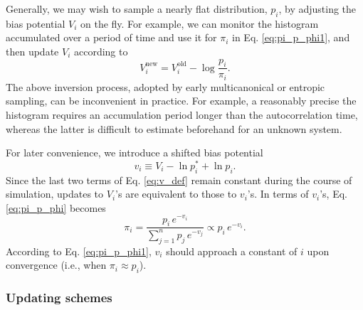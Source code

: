 \documentclass[reprint]{revtex4-1}
\begin{document}
Generally, we may wish to sample
a nearly flat distribution\cite{dayal2004, trebst2004, singh2011},
$p_i$,
by adjusting the bias potential $V_i$
on the fly.
%
For example,
we can monitor the histogram accumulated over
a period of time and use it for $\pi_i$ in
Eq. \eqref{eq:pi_p_phi1},
and then update
$V_i$ according to
$$
V_i^{\mathrm{new}}
=
V_i^{\mathrm{old}}
-
\log \frac{ p_i } { \pi_i }.
$$
%
%
The above inversion process,
adopted by early multicanonical or
entropic sampling\cite{berg1992, lee1993},
can be inconvenient in practice.
%
For example, a reasonably precise the histogram
requires an accumulation period
longer than the autocorrelation time,
whereas the latter is difficult to
estimate beforehand for an unknown system.


For later convenience, we introduce a shifted bias potential
%
\begin{equation}
  v_i \equiv V_i - \ln p^*_i + \ln p_i.
  \label{eq:v_def}
\end{equation}
%
Since the last two terms of Eq. \eqref{eq:v_def}
remain constant during the course of simulation,
updates to $V_i$'s are equivalent to those to $v_i$'s.
%
In terms of $v_i$'s, Eq. \eqref{eq:pi_p_phi}
becomes
%
\begin{equation}
  \pi_i
  =
  \frac{                p_i \, e^{-v_i} }
       { \sum_{j = 1}^n p_j \, e^{-v_j} }
  \propto
  p_i \, e^{-v_i}.
  \label{eq:pi_p_v}
\end{equation}
%
According to Eq. \eqref{eq:pi_p_phi1},
$v_i$ should approach a constant of $i$
upon convergence (i.e., when $\pi_i \approx p_i$).




\subsubsection{Updating schemes}
\end{document}
